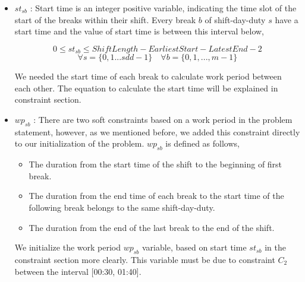 






















\begin{itemize}

\item $st_{sb}$ : Start time is an integer positive variable, indicating the time slot of the start of the breaks within their shift. Every break $b$ of shift-day-duty $s$ have a start time and the value of start time is between this interval below, 


\begin{equation}
 0 \le st_{sb} \le  Shift Length -Earliest Start -Latest End - 2  
\end{equation} 
\begin{equation}
\forall s = \{0, 1 ...sdd -1\} \quad \forall b = \{0, 1, ...,m -1 \}
\end{equation} 

We needed the start time of each break to calculate work period between each other. The equation to calculate the start time will be explained in constraint section.




\item $wp_{sb}$ : There are two soft constraints based on a work period in the problem statement, however, as we mentioned before, we added this constraint directly to our initialization of the problem. $wp_{sb}$ is defined as follows,

\begin{itemize}
\item  The duration from the start time of the shift to the beginning of first break.
\item  The duration from the end time of  each break to the start time of the following break belongs to the same shift-day-duty.
\item  The duration from the end of the last break to the end of the shift.
\end{itemize}

We initialize the work period $wp_{sb}$  variable, based on start time $st_{sb}$ in the constraint section more clearly. This variable must be due to constraint $C_2$ between the interval [00:30, 01:40].


\end{itemize}
